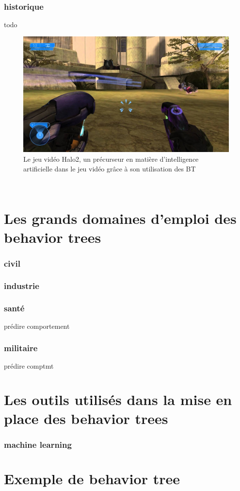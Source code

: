 \documentclass[titlepage]{article}
\begin{document}
	\section{historique}
	todo
	\\
	\begin{figure}[h!]
		\includegraphics[width=\linewidth]{img/halo2.jpg}
		\caption{Le jeu vidéo Halo2, un précurseur en matière d'intelligence artificielle dans le jeu vidéo grâce à son utilisation des BT \cite{wikipedia_halo}}
		\label{fig:BT1}
	\end{figure}
	\\
	
	\clearpage
	\part{Les grands domaines d'emploi des behavior trees}
	\section{civil}
	
	\section{industrie}
	
	\section{santé}
	prédire comportement
	
	\section{militaire}
	prédire comptmt
	
	\clearpage
	\part{Les outils utilisés dans la mise en place des behavior trees}
	\section{machine learning}
	
	\clearpage
	\part{Exemple de behavior tree}
	
	\clearpage
	
	
	
\end{document}
